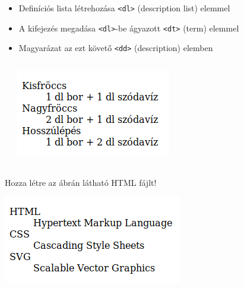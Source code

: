 \begin{frame}
  \begin{itemize}
    \item Definíciós lista létrehozása \texttt{<dl>} (description list) elemmel
    \item A kifejezés megadása \texttt{<dl>}-be ágyazott \texttt{<dt>} (term) elemmel
    \item Magyarázat az ezt követő \texttt{<dd>} (description) elemben
  \end{itemize}
  \begin{columns}[T]
      \begin{exampleblock}{}
        \scriptsize
        
      \end{exampleblock}
      \centering \includegraphics[width=\textwidth]{froccs.png}
  \end{columns}
\end{frame}

\begin{frame}
   Hozza létre az ábrán látható HTML fájlt!
  \begin{exampleblock}{}
    \centering \includegraphics[scale=0.5]{betuszavak.png}
  \end{exampleblock}
\end{frame}

